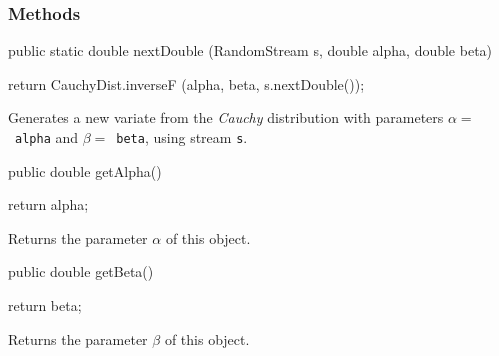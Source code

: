 \subsubsection* {Methods}
\begin{code}

   public static double nextDouble (RandomStream s,
                                    double alpha, double beta)\begin{hide} {
      return CauchyDist.inverseF (alpha, beta, s.nextDouble());
   }\end{hide}
\end{code}
\begin{tabb}
 Generates a new variate from the {\em Cauchy\/} distribution with parameters
 $\alpha = $~\texttt{alpha} and $\beta = $~\texttt{beta}, using stream \texttt{s}.
\end{tabb}
\begin{code}

   public double getAlpha()\begin{hide} {
      return alpha;
   }\end{hide}
\end{code}
\begin{tabb} Returns the parameter $\alpha$ of this object.
\end{tabb}
\begin{code}

   public double getBeta()\begin{hide} {
      return beta;
   }\end{hide}
\end{code}
\begin{tabb} Returns the parameter $\beta$ of this object.
\end{tabb}
\begin{code}\begin{hide}

   protected void setParams (double alpha, double beta) {
      if (beta <= 0.0)
         throw new IllegalArgumentException ("beta <= 0");
      this.alpha = alpha;
      this.beta = beta;
   }
}\end{hide}
\end{code}
